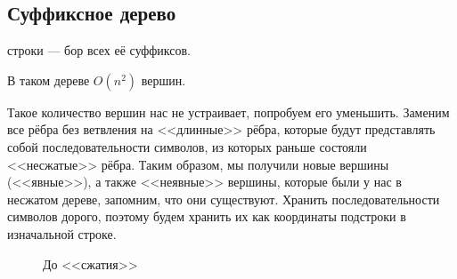 \subsection{Суффиксное дерево}

\begin{definition}
    строки --- бор всех её суффиксов.
\end{definition}

\begin{remark}
    В таком дереве $O(n^2)$ вершин.
\end{remark}

Такое количество вершин нас не устраивает, попробуем его уменьшить.
Заменим все рёбра без ветвления на <<длинные>> рёбра, которые будут представлять собой 
последовательности символов, из которых раньше состояли <<несжатые>> рёбра.
Таким образом, мы получили новые вершины (<<явные>>), 
а также <<неявные>> вершины, которые были у нас в несжатом
дереве, запомним, что они существуют.
Хранить последовательности символов дорого, поэтому будем хранить их как координаты подстроки
в изначальной строке.

\begin{figure}[H]
  \caption*{До <<сжатия>>}
  \begin{center}
  \end{center}
\end{figure}

